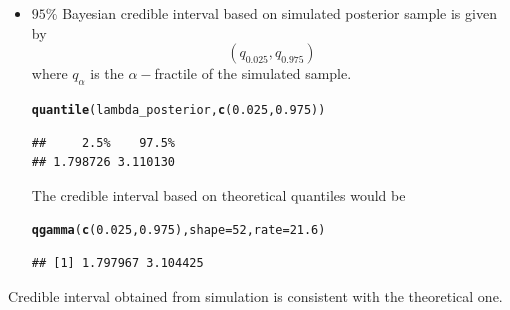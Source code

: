 \documentclass[11pt, a4paper]{article}\usepackage[]{graphicx}\usepackage[]{xcolor}
\makeatletter
\newcommand{\hlnum}[1]{\textcolor[rgb]{0.686,0.059,0.569}{#1}}%
\newcommand{\hldef}[1]{\textcolor[rgb]{0.345,0.345,0.345}{#1}}%
\newcommand{\hlkwc}[1]{\textcolor[rgb]{0.333,0.667,0.333}{#1}}%
\newcommand{\hlkwd}[1]{\textcolor[rgb]{0.737,0.353,0.396}{\textbf{#1}}}%
\newenvironment{kframe}{%
 \def\at@end@of@kframe{}%
 \ifinner\ifhmode%
  \def\at@end@of@kframe{\end{minipage}}%
  \begin{minipage}{\columnwidth}%
 \fi\fi%
 \def\FrameCommand##1{\hskip\@totalleftmargin \hskip-\fboxsep
 \colorbox{shadecolor}{##1}\hskip-\fboxsep
     \hskip-\linewidth \hskip-\@totalleftmargin \hskip\columnwidth}%
 \MakeFramed {\advance\hsize-\width
   \@totalleftmargin\z@ \linewidth\hsize
   \@setminipage}}%
 {\par\unskip\endMakeFramed%
 \at@end@of@kframe}
\newenvironment{knitrout}{}{} %
\makeatother
\begin{document}
\begin{itemize}
\item[\scalebox{2.0}{\twemoji{keycap: 6}}] $95\%$ Bayesian credible interval based on simulated posterior sample is given by $$(q_{0.025}, q_{0.975})$$ where $q_{\alpha}$ is the $\alpha-$fractile of the simulated sample.

\begin{knitrout}
\color{fgcolor}\begin{kframe}
\begin{alltt}
\hlkwd{quantile}\hldef{(lambda_posterior,} \hlkwd{c}\hldef{(}\hlnum{0.025}\hldef{,} \hlnum{0.975}\hldef{))}
\end{alltt}
\begin{verbatim}
##     2.5%    97.5% 
## 1.798726 3.110130
\end{verbatim}
\end{kframe}
\end{knitrout}


The credible interval based on theoretical quantiles would be
\begin{knitrout}
\color{fgcolor}\begin{kframe}
\begin{alltt}
\hlkwd{qgamma}\hldef{(}\hlkwd{c}\hldef{(}\hlnum{0.025}\hldef{,} \hlnum{0.975}\hldef{),} \hlkwc{shape} \hldef{=} \hlnum{52}\hldef{,} \hlkwc{rate} \hldef{=} \hlnum{21.6}\hldef{)}
\end{alltt}
\begin{verbatim}
## [1] 1.797967 3.104425
\end{verbatim}
\end{kframe}
\end{knitrout}

\end{itemize}

\smallpencil \hspace{0.1cm} {\setlength{\spaceskip}{1em plus 0.5em minus 0.5em} \fontsize{17}{20}\myfont Credible interval obtained from simulation is consistent with the theoretical one. \par}
\end{document}
